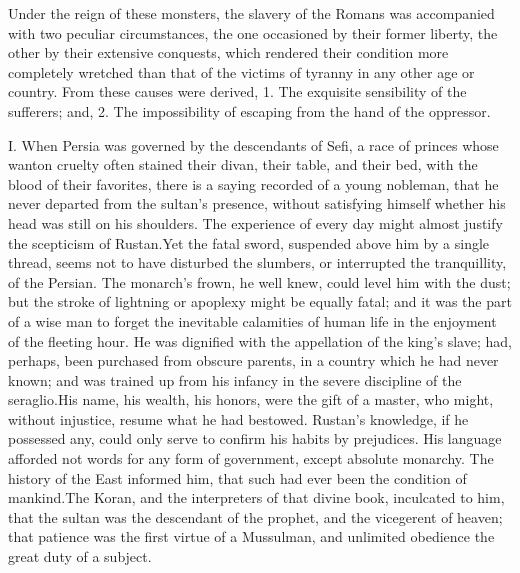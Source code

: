 
Under the reign of these monsters, the slavery of the Romans was
accompanied with two peculiar circumstances, the one occasioned
by their former liberty, the other by their extensive conquests,
which rendered their condition more completely wretched than that
of the victims of tyranny in any other age or country. From these
causes were derived, 1. The exquisite sensibility of the
sufferers; and, 2. The impossibility of escaping from the hand of
the oppressor.

I. When Persia was governed by the descendants of Sefi, a race of
princes whose wanton cruelty often stained their divan, their
table, and their bed, with the blood of their favorites, there is
a saying recorded of a young nobleman, that he never departed
from the sultan’s presence, without satisfying himself whether
his head was still on his shoulders. The experience of every day
might almost justify the scepticism of Rustan.\footnotemark[52] Yet the fatal
sword, suspended above him by a single thread, seems not to have
disturbed the slumbers, or interrupted the tranquillity, of the
Persian. The monarch’s frown, he well knew, could level him with
the dust; but the stroke of lightning or apoplexy might be
equally fatal; and it was the part of a wise man to forget the
inevitable calamities of human life in the enjoyment of the
fleeting hour. He was dignified with the appellation of the
king’s slave; had, perhaps, been purchased from obscure parents,
in a country which he had never known; and was trained up from
his infancy in the severe discipline of the seraglio.\footnotemark[53] His
name, his wealth, his honors, were the gift of a master, who
might, without injustice, resume what he had bestowed. Rustan’s
knowledge, if he possessed any, could only serve to confirm his
habits by prejudices. His language afforded not words for any
form of government, except absolute monarchy. The history of the
East informed him, that such had ever been the condition of
mankind.\footnotemark[54] The Koran, and the interpreters of that divine book,
inculcated to him, that the sultan was the descendant of the
prophet, and the vicegerent of heaven; that patience was the
first virtue of a Mussulman, and unlimited obedience the great
duty of a subject.




